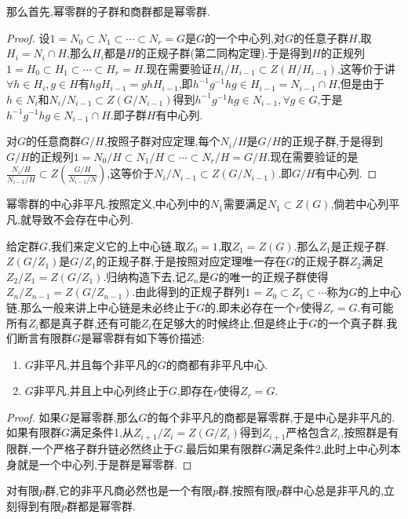 那么首先,幂零群的子群和商群都是幂零群.
\begin{proof}
	
	设$1=N_0\subset N_1\subset\cdots\subset N_r=G$是$G$的一个中心列,对$G$的任意子群$H$,取$H_i=N_i\cap H$,那么$H_i$都是$H$的正规子群(第二同构定理).于是得到$H$的正规列$1=H_0\subset H_1\subset\cdots\subset H_r=H$.现在需要验证$H_i/H_{i-1}\subset Z(H/H_{i-1})$,这等价于讲$\forall h\in H_i,g\in H$有$hgH_{i-1}=ghH_{i-1}$,即$h^{-1}g^{-1}hg\in H_{i-1}=N_{i-1}\cap H$,但是由于$h\in N_i$和$N_i/N_{i-1}\subset Z(G/N_{i-1})$得到$h^{-1}g^{-1}hg\in N_{i-1},\forall g\in G$,于是$h^{-1}g^{-1}hg\in N_{i-1}\cap H$.即子群$H$有中心列.
	
	对$G$的任意商群$G/H$,按照子群对应定理,每个$N_i/H$是$G/H$的正规子群,于是得到$G/H$的正规列$1=N_0/H\subset N_1/H\subset\cdots\subset N_r/H=G/H$.现在需要验证的是$\frac{N_i/H}{N_{i-1}/H}\subset Z(\frac{G/H}{N_{i-1}/N})$,这等价于$N_i/N_{i-1}\subset Z(G/N_{i-1})$.即$G/H$有中心列.
	
\end{proof}

幂零群的中心非平凡.按照定义,中心列中的$N_1$需要满足$N_1\subset Z(G)$,倘若中心列平凡,就导致不会存在中心列.

给定群$G$,我们来定义它的上中心链.取$Z_0=1$,取$Z_1=Z(G)$.那么$Z_1$是正规子群.$Z(G/Z_1)$是$G/Z_1$的正规子群,于是按照对应定理唯一存在$G$的正规子群$Z_2$满足$Z_2/Z_1=Z(G/Z_1)$.归纳构造下去,记$Z_n$是$G$的唯一的正规子群使得$Z_n/Z_{n-1}=Z(G/Z_{n-1})$.由此得到的正规子群列$1=Z_0\subset Z_1\subset\cdots$称为$G$的上中心链.那么一般来讲上中心链是未必终止于$G$的,即未必存在一个$r$使得$Z_r=G$.有可能所有$Z_i$都是真子群,还有可能$Z_i$在足够大的时候终止,但是终止于$G$的一个真子群.我们断言有限群$G$是幂零群有如下等价描述:
\begin{enumerate}
	\item $G$非平凡,并且每个非平凡的$G$的商都有非平凡中心.
	\item $G$非平凡,并且上中心列终止于$G$,即存在$r$使得$Z_r=G$.
\end{enumerate}
\begin{proof}
	
	如果$G$是幂零群,那么$G$的每个非平凡的商都是幂零群,于是中心是非平凡的.如果有限群$G$满足条件1,从$Z_{i+1}/Z_i=Z(G/Z_i)$得到$Z_{i+1}$严格包含$Z_i$,按照群是有限群,一个严格子群升链必然终止于$G$.最后如果有限群$G$满足条件2,此时上中心列本身就是一个中心列,于是群是幂零群.
\end{proof}

对有限$p$群,它的非平凡商必然也是一个有限$p$群,按照有限$p$群中心总是非平凡的,立刻得到有限$p$群都是幂零群.

